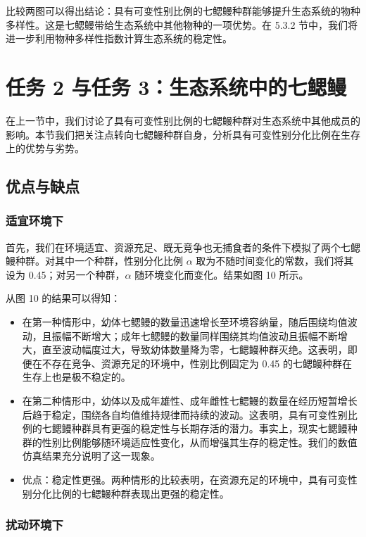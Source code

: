 \documentclass[11pt,a4paper]{ctexart}
\begin{document}
比较两图可以得出结论：具有可变性别比例的七鳃鳗种群能够提升生态系统的物种多样性。这是七鳃鳗带给生态系统中其他物种的一项优势。在 5.3.2 节中，我们将进一步利用物种多样性指数计算生态系统的稳定性。
\section{任务 2 与任务 3：生态系统中的七鳃鳗}

在上一节中，我们讨论了具有可变性别比例的七鳃鳗种群对生态系统中其他成员的影响。本节我们把关注点转向七鳃鳗种群自身，分析具有可变性别分化比例在生存上的优势与劣势。

\subsection{优点与缺点}

\subsubsection{适宜环境下}

首先，我们在环境适宜、资源充足、既无竞争也无捕食者的条件下模拟了两个七鳃鳗种群。对其中一个种群，性别分化比例 $\alpha$ 取为不随时间变化的常数，我们将其设为 0.45；对另一个种群，$\alpha$ 随环境变化而变化。结果如图 10 所示。

从图 10 的结果可以得知：

\begin{itemize}
\item 在第一种情形中，幼体七鳃鳗的数量迅速增长至环境容纳量，随后围绕均值波动，且振幅不断增大；成年七鳃鳗的数量同样围绕其均值波动且振幅不断增大，直至波动幅度过大，导致幼体数量降为零，七鳃鳗种群灭绝。这表明，即便在不存在竞争、资源充足的环境中，性别比例固定为 0.45 的七鳃鳗种群在生存上也是极不稳定的。
\item 在第二种情形中，幼体以及成年雄性、成年雌性七鳃鳗的数量在经历短暂增长后趋于稳定，围绕各自均值维持规律而持续的波动。这表明，具有可变性别比例的七鳃鳗种群具有更强的稳定性与长期存活的潜力。事实上，现实七鳃鳗种群的性别比例能够随环境适应性变化，从而增强其生存的稳定性。我们的数值仿真结果充分说明了这一现象。
\item 优点：稳定性更强。两种情形的比较表明，在资源充足的环境中，具有可变性别分化比例的七鳃鳗种群表现出更强的稳定性。
\end{itemize}

\subsubsection{扰动环境下}
\end{document}
